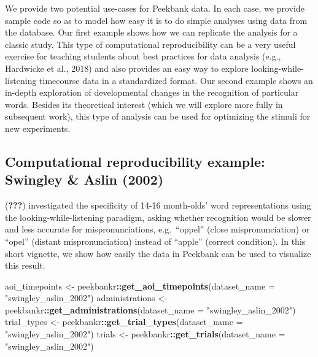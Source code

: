 \documentclass[
  english,
  man,floatsintext]{apa6}
\newenvironment{Shaded}{\begin{snugshade}}{\end{snugshade}}
\newcommand{\DataTypeTok}[1]{\textcolor[rgb]{0.13,0.29,0.53}{#1}}
\newcommand{\KeywordTok}[1]{\textcolor[rgb]{0.13,0.29,0.53}{\textbf{#1}}}
\newcommand{\NormalTok}[1]{#1}
\newcommand{\OperatorTok}[1]{\textcolor[rgb]{0.81,0.36,0.00}{\textbf{#1}}}
\newcommand{\StringTok}[1]{\textcolor[rgb]{0.31,0.60,0.02}{#1}}
\begin{document}
We provide two potential use-cases for Peekbank data. In each case, we provide sample code so as to model how easy it is to do simple analyses using data from the database. Our first example shows how we can replicate the analysis for a classic study. This type of computational reproducibility can be a very useful exercise for teaching students about best practices for data analysis (e.g., Hardwicke et al., 2018) and also provides an easy way to explore looking-while-listening timecourse data in a standardized format. Our second example shows an in-depth exploration of developmental changes in the recognition of particular words. Besides its theoretical interest (which we will explore more fully in subsequent work), this type of analysis can be used for optimizing the stimuli for new experiments.

\hypertarget{computational-reproducibility-example-swingley-aslin-2002}{%
\subsection{Computational reproducibility example: Swingley \& Aslin (2002)}\label{computational-reproducibility-example-swingley-aslin-2002}}

({\textbf{???}}) investigated the specificity of 14-16 month-olds' word representations using the looking-while-listening paradigm, asking whether recognition would be slower and less accurate for mispronunciations, e.g.~\enquote{oppel} (close mispronunciation) or \enquote{opel} (distant mispronunciation) instead of \enquote{apple} (correct condition). In this short vignette, we show how easily the data in Peekbank can be used to visualize this result.

\begin{Shaded}
\begin{Highlighting}[]
\NormalTok{aoi_timepoints <-}\StringTok{ }\NormalTok{peekbankr}\OperatorTok{::}\KeywordTok{get_aoi_timepoints}\NormalTok{(}\DataTypeTok{dataset_name =} \StringTok{"swingley_aslin_2002"}\NormalTok{)}
\NormalTok{administrations <-}\StringTok{ }\NormalTok{peekbankr}\OperatorTok{::}\KeywordTok{get_administrations}\NormalTok{(}\DataTypeTok{dataset_name =} \StringTok{"swingley_aslin_2002"}\NormalTok{)}
\NormalTok{trial_types <-}\StringTok{ }\NormalTok{peekbankr}\OperatorTok{::}\KeywordTok{get_trial_types}\NormalTok{(}\DataTypeTok{dataset_name =} \StringTok{"swingley_aslin_2002"}\NormalTok{)}
\NormalTok{trials <-}\StringTok{ }\NormalTok{peekbankr}\OperatorTok{::}\KeywordTok{get_trials}\NormalTok{(}\DataTypeTok{dataset_name =} \StringTok{"swingley_aslin_2002"}\NormalTok{)}
\end{Highlighting}
\end{Shaded}
\end{document}
